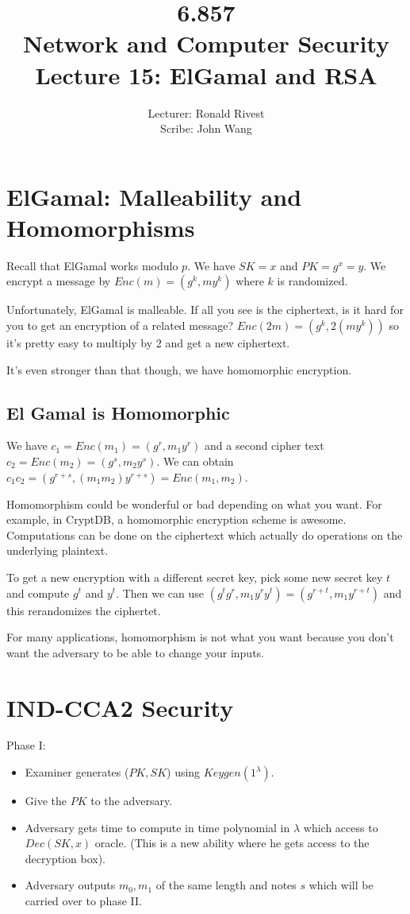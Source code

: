 \documentclass[psamsfonts]{amsart}
\title{6.857 \\
Network and Computer Security \\
Lecture 15: ElGamal and RSA}
\author{Lecturer: Ronald Rivest\\
Scribe: John Wang}
\begin{document}
\maketitle

\section{ElGamal: Malleability and Homomorphisms}

Recall that ElGamal works modulo $p$. We have $SK = x$ and $PK = g^x = y$. We encrypt a message by $Enc(m) = (g^k, m y^k)$ where $k$ is randomized.

Unfortunately, ElGamal is malleable. If all you see is the ciphertext, is it hard for you to get an encryption of a related message? $Enc(2m) = (g^k, 2 (m y^k))$ so it's pretty easy to multiply by 2 and get a new ciphertext.

It's even stronger than that though, we have homomorphic encryption.

\subsection{El Gamal is Homomorphic}

We have $c_1 = Enc(m_1) = (g^r, m_1 y^r)$ and a second cipher text $c_2 = Enc(m_2) = (g^s, m_2 y^s)$. We can obtain $c_1 c_2 = (g^{r+s}, (m_1 m_2) y^{r+s}) = Enc(m_1, m_2)$.

Homomorphism could be wonderful or bad depending on what you want. For example, in CryptDB, a homomorphic encryption scheme is awesome. Computations can be done on the ciphertext which actually do operations on the underlying plaintext.

To get a new encryption with a different secret key, pick some new secret key $t$ and compute $g^t$ and $y^t$. Then we can use $(g^t g^r, m_1 y^r y^t) = (g^{r+t}, m_1 y^{r+t})$ and this rerandomizes the ciphertet.

For many applications, homomorphism is not what you want because you don't want the adversary to be able to change your inputs.

\section{IND-CCA2 Security}

Phase I:
\begin{itemize}
  \item Examiner generates ($PK, SK$) using $Keygen(1^\lambda)$.
  \item Give the $PK$ to the adversary.
  \item Adversary gets time to compute in time polynomial in $\lambda$ which access to $Dec(SK, x)$ oracle. (This is a new ability where he gets access to the decryption box).
  \item Adversary outputs $m_0, m_1$ of the same length and notes $s$ which will be carried over to phase II.
\end{itemize}
\end{document}

